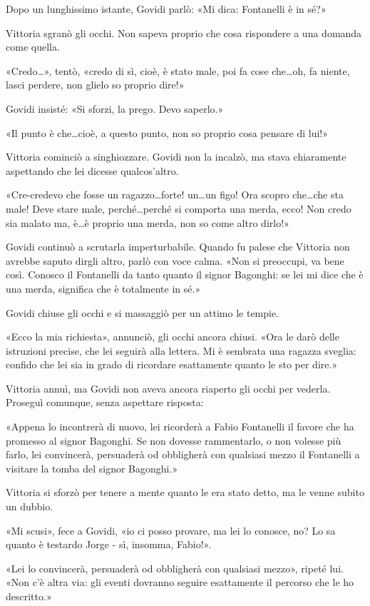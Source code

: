 Dopo un lunghissimo istante, Govidi parlò: «Mi dica: Fontanelli è in sé?»

Vittoria sgranò gli occhi. Non sapeva proprio che cosa rispondere a una domanda come quella.

«Credo\ldots», tentò, «credo di sì, cioè, è stato male, poi fa cose che\ldots oh, fa niente, lasci perdere, non glielo so proprio dire!»

Govidi insisté: «Si sforzi, la prego. Devo saperlo.»

«Il punto è che\ldots cioè, a questo punto, non so proprio cosa pensare di lui!»

Vittoria cominciò a singhiozzare. Govidi non la incalzò, ma stava chiaramente aspettando che lei dicesse qualcos'altro.

«Cre-credevo che fosse un ragazzo\ldots forte! un\ldots un figo! Ora scopro che\ldots che sta male! Deve stare male, perché\ldots perché si comporta una merda, ecco! Non credo sia malato ma, è\ldots è proprio una merda, non so come altro dirlo!»

Govidi continuò a scrutarla imperturbabile. Quando fu palese che Vittoria non avrebbe saputo dirgli altro, parlò con voce calma. «Non si preoccupi, va bene così. Conosco il Fontanelli da tanto quanto il signor Bagonghi: se lei mi dice che è una merda, significa che è totalmente in sé.»

Govidi chiuse gli occhi e si massaggiò per un attimo le tempie.

«Ecco la mia richiesta», annunciò, gli occhi ancora chiusi. «Ora le darò delle istruzioni precise, che lei seguirà alla lettera. Mi è sembrata una ragazza sveglia: confido che lei sia in grado di ricordare esattamente quanto le sto per dire.»

Vittoria annuì, ma Govidi non aveva ancora riaperto gli occhi per vederla. Proseguì comunque, senza aspettare risposta:

«Appena lo incontrerà di nuovo, lei ricorderà a Fabio Fontanelli il favore che ha promesso al signor Bagonghi. Se non dovesse rammentarlo, o non volesse più farlo, lei convincerà, persuaderà od obbligherà con qualsiasi mezzo il Fontanelli a visitare la tomba del signor Bagonghi.»

Vittoria si sforzò per tenere a mente quanto le era stato detto, ma le venne subito un dubbio.

«Mi scusi», fece a Govidi, «io ci posso provare, ma lei lo conosce, no? Lo sa quanto è testardo Jorge - sì, insomma, Fabio!».

«Lei lo convincerà, persuaderà od obbligherà con qualsiasi mezzo», ripeté lui. «Non c'è altra via: gli eventi dovranno seguire esattamente il percorso che le ho descritto.»

